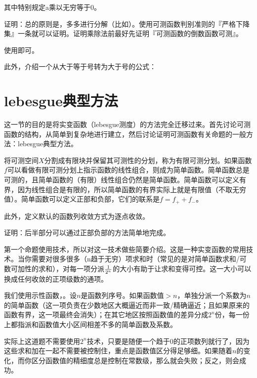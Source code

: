 其中特别规定a乘以无穷等于0。

证明：总的原则是，多多进行分解（比如）。使用可测函数判别准则的『严格下降集』一条就可以证明。证明乘除法前最好先证明『可测函数的倒数函数可测』。

使用即可。

此外，介绍一个从大于等于号转为大于号的公式：



\section{lebesgue典型方法}

这一节的目的是将实变函数（lebesgue测度）的方法完全迁移过来。首先讨论可测函数的结构，从简单到复杂地进行建立，然后讨论证明可测函数有关命题的一般方法：lebesgue典型方法。

将可测空间$X$分割成有限块并保留其可测性的分划，称为有限可测分划。如果函数$f$可以看做有限可测分划上指示函数的线性组合，则成为简单函数。简单函数总是可测的，且简单函数的（有限）线性组合仍然是简单函数。简单函数可以定义有界，因为线性组合是有限的，所以简单函数的有界实际上就是有限值（不取无穷值）。简单函数可以定义正部和负部，它们的联系是$f=f_++f_-$。

此外，定义默认的函数列收敛方式为逐点收敛。


证明：后半部分可以通过正部负部的方法简单地完成。

第一个命题使用技术，所以对这一技术做些简要介绍。这是一种实变函数的常用技术。当你需要对很多很多（n趋于无穷）项求和时（常见的是对简单函数求和/可数可加性的求和），对每一项分派$\frac{1}{2^n}$的大小有助于让求和变得可控。这一大小可以换成任何收敛的正项级数的通项。

我们使用示性函数，。设$n$是函数列序号。如果函数值$>n$，单独分派一个系数为$n$的简单函数（这一项负责在少数地区大概逼近而非一致/精确逼近；且如果原来的函数有界，这一项最终会消失）；在其它地区按照函数值的差异分成$2^n$份，每一份上都指派和函数值大小区间相差不多的简单函数及系数。

实际上这道题不需要使用$2^n$技术，只要是随便一个趋于0的正项数列就行了，因为这些求和加在一起不需要被控制住，重点是函数值区分得足够细。如果随着$n$的变化，而你区分函数值的精细度总是控制在常数级，那么就会失败；反之，则会成功。

